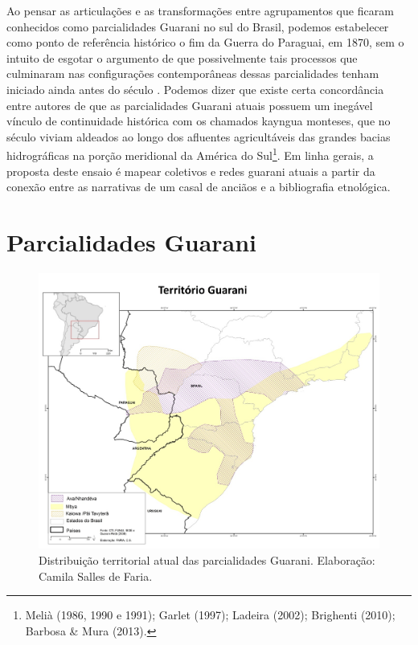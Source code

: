 Ao pensar as articulações e as transformações entre agrupamentos que
ficaram conhecidos como parcialidades Guarani no sul do Brasil, podemos
estabelecer como ponto de referência histórico o fim da Guerra do
Paraguai, em 1870, sem o intuito de esgotar o argumento de que
possivelmente tais processos que culminaram nas configurações
contemporâneas dessas parcialidades tenham iniciado ainda antes do
século . Podemos dizer que existe certa concordância entre autores
de que as parcialidades Guarani atuais possuem um inegável vínculo de
continuidade histórica com os chamados kayngua monteses, que no século
 viviam aldeados ao longo dos afluentes agricultáveis das grandes
bacias hidrográficas na porção meridional da América do
Sul\footnote{Melià (1986, 1990 e 1991); Garlet (1997); Ladeira (2002);
Brighenti (2010); Barbosa \& Mura (2013).}. Em linha gerais, a proposta
deste ensaio é mapear coletivos e redes guarani atuais a partir da
conexão entre as narrativas de um casal de anciãos e a bibliografia
etnológica. 

\section{Parcialidades Guarani}

\begin{figure}
  \centering
 \includegraphics[width=\textwidth]{./img/GUARANIS-img7.jpg}	
  \hfill
  \caption{Distribuição territorial atual das parcialidades Guarani. Elaboração: Camila Salles de Faria.}
\end{figure}


